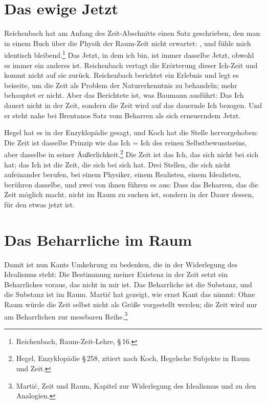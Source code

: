 \section{Das ewige Jetzt}

Reichenbach hat am Anfang des Zeit-Abschnitts einen Satz geschrieben, den man in einem Buch über die Physik der Raum-Zeit nicht erwartet: , und fühle mich identisch bleibend.\footnote{Reichenbach, Raum-Zeit-Lehre, \S\,16.} Das Jetzt, in dem ich bin, ist immer dasselbe Jetzt, obwohl es immer ein anderes ist. Reichenbach vertagt die Erörterung dieser Ich-Zeit und kommt nicht auf sie zurück. Reichenbach berichtet ein Erlebnis und legt es beiseite, um die Zeit als Problem der Naturerkenntnis zu behandeln; mehr behauptet er nicht. Aber das Berichtete ist, was Baumann ausführt: Das Ich dauert nicht in der Zeit, sondern die Zeit wird auf das dauernde Ich bezogen. Und er steht nahe bei Brentanos Satz vom Beharren als sich erneuerndem Jetzt.

Hegel hat es in der Enzyklopädie gesagt, und Koch hat die Stelle hervorgehoben: Die Zeit ist dasselbe Prinzip wie das Ich = Ich des reinen Selbstbewusstseins, aber dasselbe in seiner Äußerlichkeit.\footnote{Hegel, Enzyklopädie \S\,258, zitiert nach Koch, Hegelsche Subjekte in Raum und Zeit.} Die Zeit ist das Ich, das sich nicht bei sich hat; das Ich ist die Zeit, die sich bei sich hat. Drei Stellen, die sich nicht aufeinander berufen, bei einem Physiker, einem Realisten, einem Idealisten, berühren dasselbe, und zwei von ihnen führen es aus: Dass das Beharren, das die Zeit möglich macht, nicht im Raum zu suchen ist, sondern in der Dauer dessen, für den etwas jetzt ist.

\section{Das Beharrliche im Raum}

Damit ist nun Kants Umkehrung zu bedenken, die in der Widerlegung des Idealismus steht: Die Bestimmung meiner Existenz in der Zeit setzt ein Beharrliches voraus, das nicht in mir ist. Das Beharrliche ist die Substanz, und die Substanz ist im Raum. Martić hat gezeigt, wie ernst Kant das nimmt: Ohne Raum würde die Zeit selbst nicht als Größe vorgestellt werden; die Zeit wird nur am Beharrlichen zur messbaren Reihe.\footnote{Martić, Zeit und Raum, Kapitel zur Widerlegung des Idealismus und zu den Analogien.}


